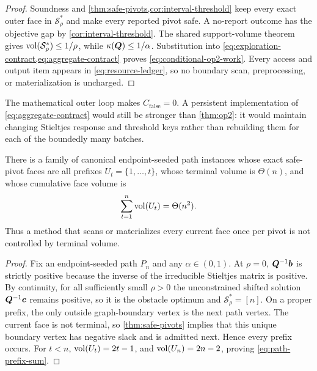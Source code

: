 \begin{proof}
Soundness and \cref{thm:safe-pivots,cor:interval-threshold} keep every exact
outer face in $\mathcal S_\rho^*$ and make every reported pivot safe.  A
no-report outcome has the objective gap by
\cref{cor:interval-threshold}.  The shared support-volume theorem gives
$\operatorname{vol}(\mathcal S_\rho^*)\leq1/\rho$, while
$\kappa(\bm{Q})\leq1/\alpha$.  Substitution into
\cref{eq:exploration-contract,eq:aggregate-contract} proves
\cref{eq:conditional-op2-work}.  Every access and output item appears in
\cref{eq:resource-ledger}, so no boundary scan, preprocessing, or
materialization is uncharged.
\end{proof}

The mathematical outer loop makes $C_{\mathrm{false}}=0$.  A persistent
implementation of \cref{eq:aggregate-contract} would still be stronger than
\cref{thm:op2}: it would maintain changing Stieltjes response and threshold
keys rather than rebuilding them for each of the boundedly many batches.

\begin{proposition}
\label{prop:terminal-insufficient}
There is a family of canonical endpoint-seeded path instances whose exact
safe-pivot faces are all prefixes $U_t=\{1,\ldots,t\}$, whose terminal volume
is $\Theta(n)$, and whose cumulative face volume is
\begin{equation}
 \sum_{t=1}^n\operatorname{vol}(U_t)=\Theta(n^2).
 \label{eq:path-prefix-sum}
\end{equation}
Thus a method that scans or materializes every current face once per pivot is
not controlled by terminal volume.
\end{proposition}

\begin{proof}
Fix an endpoint-seeded path $P_n$ and any $\alpha\in(0,1)$.  At $\rho=0$,
$\bm{Q}^{-1}\bm{b}$ is strictly positive because the inverse of the irreducible
Stieltjes matrix is positive.  By continuity, for all sufficiently small
$\rho>0$ the unconstrained shifted solution $\bm{Q}^{-1}\bm{c}$ remains positive,
so it is the obstacle optimum and $\mathcal S_\rho^*=[n]$.  On a proper prefix, the only
outside graph-boundary vertex is the next path vertex.  The current face is
not terminal, so \cref{thm:safe-pivots} implies that this unique boundary
vertex has negative slack and is admitted next.  Hence every prefix occurs.
For $t<n$, $\operatorname{vol}(U_t)=2t-1$, and $\operatorname{vol}(U_n)=2n-2$, proving
\cref{eq:path-prefix-sum}.
\end{proof}

